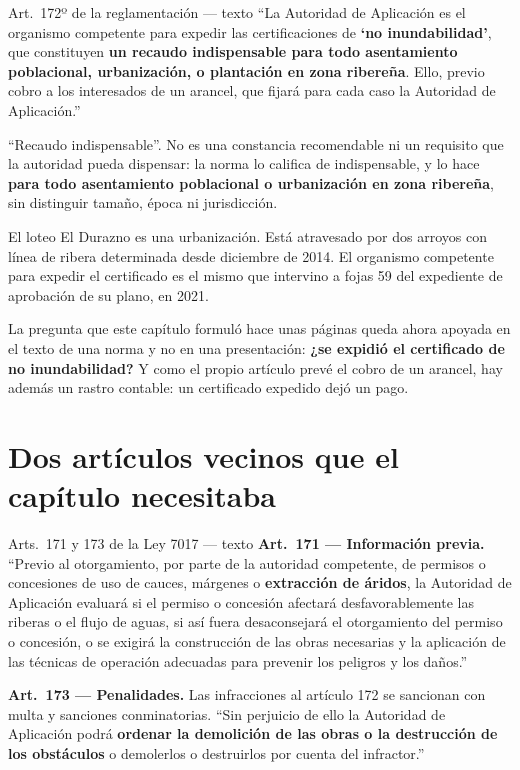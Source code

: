 \begin{ficha}{Art.\ 172º de la reglamentación --- texto}
``La Autoridad de Aplicación es el organismo competente para expedir las certificaciones de \textbf{`no inundabilidad'}, que constituyen \textbf{un recaudo indispensable para todo asentamiento poblacional, urbanización, o plantación en zona ribereña}. Ello, previo cobro a los interesados de un arancel, que fijará para cada caso la Autoridad de Aplicación.''
\end{ficha}

``Recaudo indispensable''. No es una constancia recomendable ni un requisito que la autoridad pueda dispensar: la norma lo califica de indispensable, y lo hace \textbf{para todo asentamiento poblacional o urbanización en zona ribereña}, sin distinguir tamaño, época ni jurisdicción.

El loteo El Durazno es una urbanización. Está atravesado por dos arroyos con línea de ribera determinada desde diciembre de 2014. El organismo competente para expedir el certificado es el mismo que intervino a fojas 59 del expediente de aprobación de su plano, en 2021.

La pregunta que este capítulo formuló hace unas páginas queda ahora apoyada en el texto de una norma y no en una presentación: \textbf{¿se expidió el certificado de no inundabilidad?} Y como el propio artículo prevé el cobro de un arancel, hay además un rastro contable: un certificado expedido dejó un pago.

\section{Dos artículos vecinos que el capítulo necesitaba}

\begin{ficha}{Arts.\ 171 y 173 de la Ley 7017 --- texto}
\textbf{Art.\ 171 --- Información previa.} ``Previo al otorgamiento, por parte de la autoridad competente, de permisos o concesiones de uso de cauces, márgenes o \textbf{extracción de áridos}, la Autoridad de Aplicación evaluará si el permiso o concesión afectará desfavorablemente las riberas o el flujo de aguas, si así fuera desaconsejará el otorgamiento del permiso o concesión, o se exigirá la construcción de las obras necesarias y la aplicación de las técnicas de operación adecuadas para prevenir los peligros y los daños.''

\textbf{Art.\ 173 --- Penalidades.} Las infracciones al artículo 172 se sancionan con multa y sanciones conminatorias. ``Sin perjuicio de ello la Autoridad de Aplicación podrá \textbf{ordenar la demolición de las obras o la destrucción de los obstáculos} o demolerlos o destruirlos por cuenta del infractor.''
\end{ficha}

